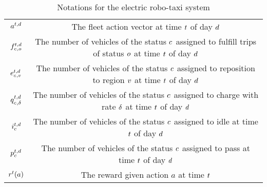 \begin{table}[htb]
\begin{tabular}{|c|c|}
        $a^{t, d}_{}$ & The fleet action vector at time $t$ of day $d$\\
        $f^{t, d}_{c_{}, o_{}}$ & The number of vehicles of the status $c_{}$ assigned to fulfill trips of status $o_{}$ at time $t$ of day $d$ \\
        $e^{t, d}_{c_{}, v}$ & The number of vehicles of the status $c_{}$ assigned to reposition to region $v$ at time $t$ of day $d$ \\
        $q^{t, d}_{c_{}, \delta}$ & The number of vehicles of the status $c_{}$ assigned to charge with rate $\delta$ at time $t$ of day $d$ \\
        $i^{t, d}_{c_{}}$ & The number of vehicles of the status $c_{}$ assigned to idle at time $t$ of day $d$ \\
        $p^{t, d}_{c_{}}$ & The number of vehicles of the status $c_{}$ assigned to pass at time $t$ of day $d$ \\
        $r^{t}_{}(a)$ & The reward given action $a$ at time $t$ \\
        \hline
    \end{tabular}
    \caption{Notations for the electric robo-taxi system}
    \label{tab:notations}
\end{table}
